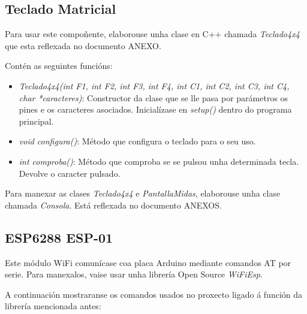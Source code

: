 \documentclass[11pt,twoside]{book}
\begin{document}
\subsection{Teclado Matricial}

Para usar este compoñente, elaborouse unha clase en C++ chamada \textit{Teclado4x4} que esta reflexada no documento ANEXO.

Contén as seguintes funcións:

\begin{itemize}
    \item \textit{Teclado4x4(int F1, int F2, int F3, int F4, int C1, int C2, int C3, int C4, char *caracteres)}: Constructor da clase que se lle pasa por parámetros os pines e os caracteres asociados. Inicialízase en \textit{setup()} dentro do programa principal.
    \item \textit{void configura()}: Método que configura o teclado para o seu uso.
    \item \textit{int comproba()}: Método que comproba se se pulsou unha determinada tecla. Devolve o caracter pulsado.
\end{itemize}

Para manexar as clases \textit{Teclado4x4} e \textit{PantallaMidas}, elaborouse unha clase chamada \textit{Consola}. Está reflexada no documento ANEXOS.

\subsection{ESP6288 ESP-01}

Este módulo WiFi comunícase coa placa Arduino mediante comandos AT por serie. Para manexalos, vaise usar unha librería Open Source \textit{WiFiEsp}\cite{esp}.

A continuación mostraranse os comandos usados no proxecto ligado á función da librería mencionada antes:
\end{document}
